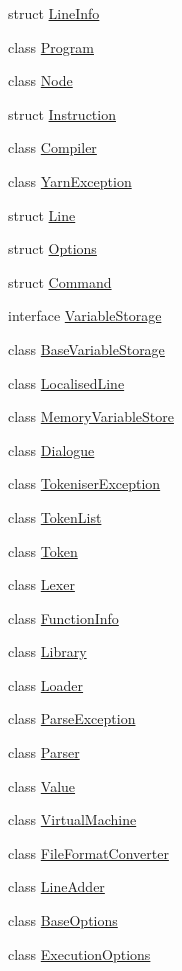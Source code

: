 \begin{DoxyCompactItemize}
\item 
struct \hyperlink{a00103}{Line\-Info}
\item 
class \hyperlink{a00124}{Program}
\item 
class \hyperlink{a00029_da/de0/a00317}{Node}
\item 
struct \hyperlink{a00093}{Instruction}
\item 
class \hyperlink{a00032}{Compiler}
\item 
class \hyperlink{a00168}{Yarn\-Exception}
\item 
struct \hyperlink{a00029_d4/d6f/a00315}{Line}
\item 
struct \hyperlink{a00029_d2/d41/a00318}{Options}
\item 
struct \hyperlink{a00029_d7/df2/a00312}{Command}
\item 
interface \hyperlink{a00164}{Variable\-Storage}
\item 
class \hyperlink{a00021}{Base\-Variable\-Storage}
\item 
class \hyperlink{a00106}{Localised\-Line}
\item 
class \hyperlink{a00108}{Memory\-Variable\-Store}
\item 
class \hyperlink{a00070}{Dialogue}
\item 
class \hyperlink{a00148}{Tokeniser\-Exception}
\item 
class \hyperlink{a00149}{Token\-List}
\item 
class \hyperlink{a00147}{Token}
\item 
class \hyperlink{a00099}{Lexer}
\item 
class \hyperlink{a00082}{Function\-Info}
\item 
class \hyperlink{a00101}{Library}
\item 
class \hyperlink{a00105}{Loader}
\item 
class \hyperlink{a00119}{Parse\-Exception}
\item 
class \hyperlink{a00121}{Parser}
\item 
class \hyperlink{a00161}{Value}
\item 
class \hyperlink{a00136}{Virtual\-Machine}
\item 
class \hyperlink{a00081}{File\-Format\-Converter}
\item 
class \hyperlink{a00102}{Line\-Adder}
\item 
class \hyperlink{a00020}{Base\-Options}
\item 
class \hyperlink{a00079}{Execution\-Options}

\end{DoxyCompactItemize}
